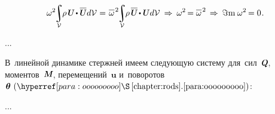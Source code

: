 \begin{otherlanguage}{russian}
\nopagebreak\vspace{-0.2em}\begin{equation*}
\omega^2 \hspace{-0.1em}
\scalebox{0.92}{$\displaystyle \integral\displaylimits_{\mathcal{V}}$} \hspace{-0.25ex}
\rho \hspace{.33ex} \mathboldU \hspace{-0.15ex} \dotp \lineoverlower{\mathboldU}
\hspace{.1ex} d\mathcal{V} \hspace{.05ex}
= \hspace{.2ex}
\lineover{\omega}^{\hspace{.2ex}2} \hspace{-0.1em}
\scalebox{0.92}{$\displaystyle \integral\displaylimits_{\mathcal{V}}$} \hspace{-0.25ex}
\rho \hspace{.33ex} \lineoverlower{\mathboldU} \hspace{-0.15ex} \dotp \mathboldU
\hspace{.1ex} d\mathcal{V}
%
\hspace{.22em} \Rightarrow \hspace{.22em}
%
\omega^2 \hspace{-0.25ex} = \lineover{\omega}^{\hspace{.2ex}2} \hspace{-0.15ex}
%
\hspace{.22em} \Rightarrow \hspace{.22em}
%
\imaginarypart{\omega^2} \hspace{-0.2ex} = 0
\hspace{.15ex} .
\end{equation*}

...




\end{otherlanguage}



\begin{otherlanguage}{russian}

В~линейной динамике стержней имеем следующую систему для~сил~$\mathboldQ$, моментов~$\mathboldM$, перемещений~$\bm{u}$ и~поворотов~$\bm{\theta}~(\chapdotpararef{chapter:rods}{para:ooooooooo})$:

...



\end{otherlanguage}

